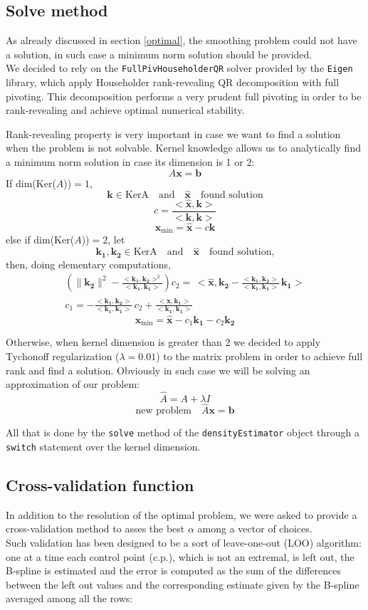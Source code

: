 \subsection{Solve method} \label{solvemethod}
As already discussed in section \ref{optimal}, the smoothing problem could not have a solution, in such case a minimum norm solution should be provided. \\
We decided to rely on the \verb|FullPivHouseholderQR| solver provided by the \verb|Eigen| library, which apply Householder rank-revealing QR decomposition with full pivoting. This decomposition performs a very prudent full pivoting in order to be rank-revealing and achieve optimal numerical stability. 

Rank-revealing property is very important in case we want to find a solution when the problem is not solvable. Kernel knowledge allows us to analytically find a minimum norm solution in case its dimension is 1 or 2:
\[ A\bm{x}=\bm{b} \]
If dim(Ker($A$))$=1$,
\[ \bm{k}\in\text{Ker{A}} \quad \text{and} \quad \bm{\hat{x}} \quad \text{found solution} \]
\[ c=\frac{<\bm{\hat{x}},\bm{k}>}{<\bm{k},\bm{k}>} \]
\[ \bm{x}_{\text{min}} = \bm{\hat{x}} - c\bm{k} \]
else if dim(Ker($A$))$=2$, let
\[ \bm{k_1}, \bm{k_2} \in\text{Ker{A}} \quad \text{and} \quad \bm{\hat{x}} \quad \text{found solution,} \]
then, doing elementary computations,
\begin{gather*}
\left( \| \bm{k_2} \|^2 - \frac{<\bm{k_1},\bm{k_2}>^2}{<\bm{k_1},\bm{k_1}>} \right) c_2 = \, <\bm{\hat{x}},\bm{k_2} - \frac{<\bm{k_1},\bm{k_2}>}{<\bm{k_1},\bm{k_1}>} \, \bm{k_1}> \\
c_1 = - \frac{<\bm{k_1},\bm{k_2}>}{<\bm{k_1},\bm{k_1}>} \, c_2 +  \frac{<\bm{\hat{x}},\bm{k_1}>}{<\bm{k_1},\bm{k_1}>}
\end{gather*}  
\[ \bm{x}_{\text{min}} = \bm{\hat{x}} - c_1\bm{k_1} - c_2\bm{k_2} \]

Otherwise, when kernel dimension is greater than 2 we decided to apply Tychonoff regularization ($\lambda=0.01$) to the matrix problem in order to achieve full rank and find a solution. Obviously in such case we will be solving an approximation of our problem:
\[  \hat{A}=A + \lambda I \]
\[  \text{new problem} \quad \hat{A}\bm{x}=\bm{b} \]

All that is done by the \verb|solve| method of the \verb|densityEstimator| object through a \verb|switch| statement over the kernel dimension.

\subsection{Cross-validation function} \label{cv}
In addition to the resolution of the optimal problem, we were asked to provide a cross-validation method to asses the best $\alpha$ among a vector of choices. \\ Such validation has been designed to be a sort of leave-one-out (LOO) algorithm: one at a time each control point (c.p.), which is not an extremal, is left out, the B-spline is estimated and the error is computed as the sum of the differences between the left out values and the corresponding estimate given by the B-spline averaged among all the rows:

